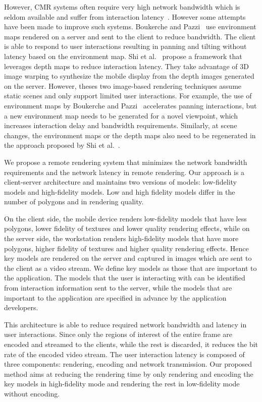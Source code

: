 However, CMR systems often require very high network bandwidth which is seldom available and suffer from interaction latency~\cite{chen2014}. However some attempts have been made to improve such systems. 
Boukerche and Pazzi~\cite{boukerche2006} use environment maps rendered on a server and sent to the client to reduce bandwidth. The client is able to respond to user interactions resulting in panning and tilting without latency based on the environment map.
Shi et al.~\cite{shi2012} propose a framework that leverages depth maps to reduce interaction latency. They take advantage of 3D image warping to synthesize the mobile display from the depth images generated on the server.
However, theses two image-based rendering techniques assume static scenes and only support limited user interactions.
For example, the use of environment maps by Boukerche and Pazzi~\cite{boukerche2006} accelerates panning interactions, but a new environment map needs to be generated for a novel viewpoint, which increases interaction delay and bandwidth requirements. Similarly, at scene changes, the environment maps or the depth maps also need to be regenerated in the approach proposed by Shi et al.~\cite{shi2012}.

We propose a remote rendering system that minimizes the network bandwidth requirements and the network latency in remote rendering.
Our approach is a client-server architecture and maintains two versions of models: low-fidelity models and high-fidelity models.
Low and high fidelity models differ in the number of polygons and in rendering quality.

On the client side, the mobile device renders low-fidelity models that have less polygons, lower fidelity of textures and lower quality rendering effects, while on the server side, the workstation renders high-fidelity models that have more polygons, higher fidelity of textures and higher quality rendering effects. Hence key models are rendered on the server and captured in images which are sent to the client as a video stream. We define key models as those that are important to the application. The models that the user is interacting with can be identified from interaction information sent to the server, while the models that are important to the application are specified in advance by the application developers.

This architecture is able to reduce required network bandwidth and latency in user interactions.
Since only the regions of interest of the entire frame are encoded and streamed to the clients, while the rest is discarded, it reduces the bit rate of the encoded video stream.
The user interaction latency is composed of three components: rendering, encoding and network transmission. Our proposed method aims at reducing the rendering time by only rendering and encoding the key models in high-fidelity mode and rendering the rest in low-fidelity mode without encoding.

